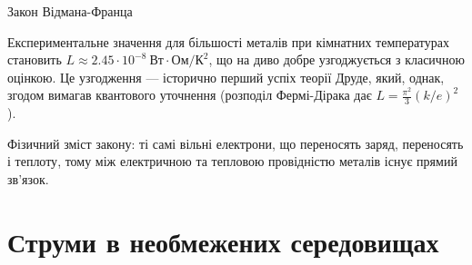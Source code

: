 \documentclass[onlytextwidth]{beamer}
\begin{document}
\begin{frame}{Закон Відмана-Франца}{}
\begin{overprint}
\begin{block}{}
			Експериментальне значення для більшості металів при кімнатних температурах
			становить $L \approx 2.45\cdot10^{-8}\ \text{Вт}\cdot\text{Ом}/\text{К}^2$, що
			на диво добре узгоджується з класичною оцінкою. Це узгодження --- історично
			перший успіх теорії Друде, який, однак, згодом вимагав квантового уточнення
			(розподіл Фермі-Дірака дає $L = \frac{\pi^2}{3}(k/e)^2$).
		\end{block}
		\begin{block}{}\justifying
			Фізичний зміст закону: \alert{ті самі вільні електрони, що переносять заряд,
				переносять і теплоту}, тому між електричною та тепловою провідністю металів
			існує прямий зв'язок.
		\end{block}
	\end{overprint}
\end{frame}


\section{Струми в необмежених середовищах}
\end{document}
